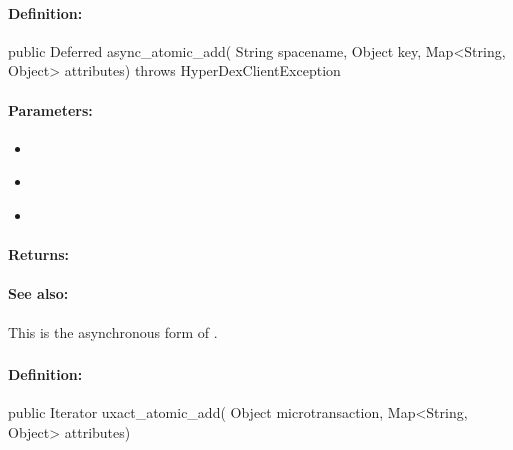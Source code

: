 \paragraph{Definition:}
\begin{javacode}
public Deferred async_atomic_add(
        String spacename,
        Object key,
        Map<String, Object> attributes) throws HyperDexClientException
\end{javacode}

\paragraph{Parameters:}
\begin{itemize}[noitemsep]
\item {}\\

\item {}\\

\item {}\\

\end{itemize}

\paragraph{Returns:}


\paragraph{See also:}  This is the asynchronous form of .

\pagebreak
\subsubsection{}
\label{api:java:uxact_atomic_add}


\paragraph{Definition:}
\begin{javacode}
public Iterator uxact_atomic_add(
        Object microtransaction,
        Map<String, Object> attributes)
\end{javacode}

